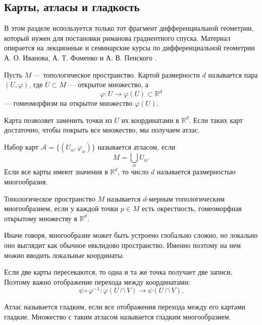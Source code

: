 \documentclass[a4paper,12pt]{article}
\newcommand{\R}{\mathbb{R}}
\begin{document}
\subsection{Карты, атласы и гладкость}

В этом разделе используется только тот фрагмент дифференциальной геометрии, который нужен для постановки риманова градиентного спуска. Материал опирается на лекционные и семинарские курсы по дифференциальной геометрии А. О. Иванова, А. Т. Фоменко и А. В. Пенского \cite{ivanov-dg,fomenko-dg,penskoy-seminars}.

\begin{definition}
Пусть $M$ --- топологическое пространство. Картой размерности $d$ называется пара $(U,\varphi)$, где $U\subset M$ --- открытое множество, а
\[
\varphi:U\to \varphi(U)\subset\R^d
\]
--- гомеоморфизм на открытое множество $\varphi(U)$.
\end{definition}

Карта позволяет заменить точки из $U$ их координатами в $\R^d$. Если таких карт достаточно, чтобы покрыть все множество, мы получаем атлас.

\begin{definition}
Набор карт $\mathcal A=\{(U_\alpha,\varphi_\alpha)\}$ называется атласом, если
\[
M=\bigcup_\alpha U_\alpha.
\]
Если все карты имеют значения в $\R^d$, то число $d$ называется размерностью многообразия.
\end{definition}

\begin{definition}
Топологическое пространство $M$ называется $d$-мерным топологическим многообразием, если у каждой точки $p\in M$ есть окрестность, гомеоморфная открытому множеству в $\R^d$.
\end{definition}

Иначе говоря, многообразие может быть устроено глобально сложно, но локально оно выглядит как обычное евклидово пространство. Именно поэтому на нем можно вводить локальные координаты.

Если две карты пересекаются, то одна и та же точка получает две записи. Поэтому важно отображение перехода между координатами:
\[
\psi\circ\varphi^{-1}:\varphi(U\cap V)\to\psi(U\cap V).
\]

\begin{definition}
Атлас называется гладким, если все отображения перехода между его картами гладкие. Множество с таким атласом называется гладким многообразием.
\end{definition}
\end{document}
